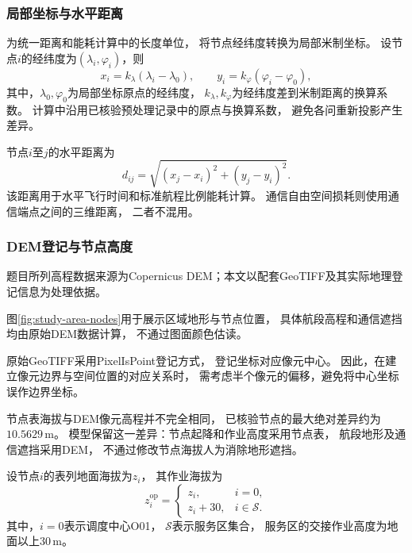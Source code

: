 \documentclass[bwprint]{gmcmthesis}
\begin{document}
\subsubsection{局部坐标与水平距离}

为统一距离和能耗计算中的长度单位，
将节点经纬度转换为局部米制坐标。
设节点$i$的经纬度为$(\lambda_i,\varphi_i)$，则
\begin{equation}
    x_i=k_{\lambda}(\lambda_i-\lambda_0),
    \qquad
    y_i=k_{\varphi}(\varphi_i-\varphi_0),
\end{equation}
其中，$\lambda_0,\varphi_0$为局部坐标原点的经纬度，
$k_{\lambda},k_{\varphi}$为经纬度差到米制距离的换算系数。
计算中沿用已核验预处理记录中的原点与换算系数，
避免各问重新投影产生差异。

节点$i$至$j$的水平距离为
\begin{equation}
    d_{ij}
    =
    \sqrt{(x_j-x_i)^2+(y_j-y_i)^2}.
\end{equation}
该距离用于水平飞行时间和标准航程比例能耗计算。
通信自由空间损耗则使用通信端点之间的三维距离，
二者不混用。

\subsubsection{DEM登记与节点高度}
题目所列高程数据来源为Copernicus DEM\cite{copdem}；本文以配套GeoTIFF及其实际地理登记信息为处理依据。


图\ref{fig:study-area-nodes}用于展示区域地形与节点位置，
具体航段高程和通信遮挡均由原始DEM数据计算，
不通过图面颜色估读。

原始GeoTIFF采用PixelIsPoint登记方式，
登记坐标对应像元中心。
因此，在建立像元边界与空间位置的对应关系时，
需考虑半个像元的偏移，避免将中心坐标误作边界坐标。

节点表海拔与DEM像元高程并不完全相同，
已核验节点的最大绝对差异约为$10.5629\,\mathrm{m}$。
模型保留这一差异：节点起降和作业高度采用节点表，
航段地形及通信遮挡采用DEM，
不通过修改节点海拔人为消除地形遮挡。

设节点$i$的表列地面海拔为$z_i$，
其作业海拔为
\begin{equation}
    z_i^{\mathrm{op}}
    =
    \begin{cases}
        z_i, & i=0,\\
        z_i+30, & i\in\mathcal{S}.
    \end{cases}
\end{equation}
其中，$i=0$表示调度中心O01，
$\mathcal{S}$表示服务区集合，
服务区的交接作业高度为地面以上$30\,\mathrm{m}$。
\end{document}
